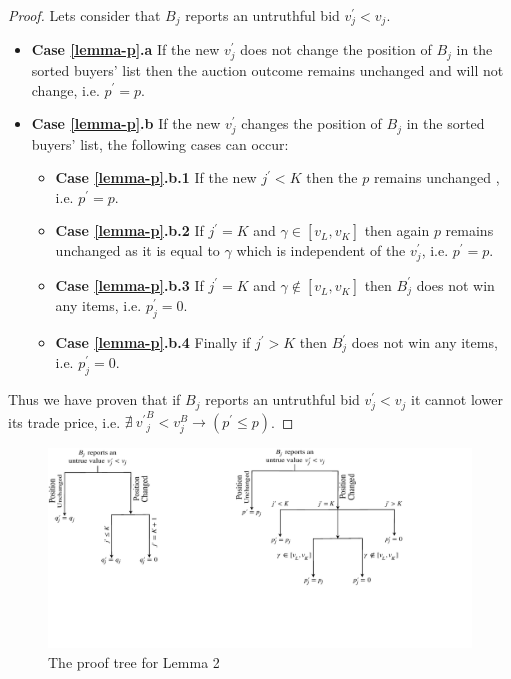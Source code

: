 \begin{proof}
Lets consider that $B_j$ reports an untruthful bid $v^\prime_j < v_j$.
\begin{itemize}
    \item[] \textbf{Case \ref{lemma-p}.a} If the new $v^\prime_j$ does not change the position of $B_j$ in the sorted buyers' list then the auction outcome remains unchanged and will not change, i.e. $p^\prime = p$.
    \item[] \textbf{Case \ref{lemma-p}.b} If the new $v^\prime_j$ changes the position of $B_j$ in the sorted buyers' list, the following cases can occur:
    \begin{itemize}
    \item[] \textbf{Case \ref{lemma-p}.b.1} If the new $j^\prime < K$ then the $p$ remains unchanged , i.e. $p^\prime = p$.
    \item[] \textbf{Case \ref{lemma-p}.b.2} If $j^\prime = K$ and $\gamma \in [{v^{}_L}, {v^{}_K}]$ then again $p$ remains unchanged as it is equal to $\gamma$ which is independent of the $v^\prime_j$, i.e. $p^\prime = p$.
    \item[] \textbf{Case \ref{lemma-p}.b.3} If $j^\prime = K$ and $\gamma \notin [{v^{}_L} , {v^{}_K}]$ then $B^\prime_j$ does not win any items, i.e. $p^\prime_j=0$.
    \item[] \textbf{Case \ref{lemma-p}.b.4} Finally if $j^\prime > K$ then $B^\prime_j$ does not win any items, i.e. $p^\prime_j=0$.
    \end{itemize}
\end{itemize}
Thus we have proven that if $B_j$ reports an untruthful bid $v^\prime_j < v_j$ it cannot lower its trade price, i.e. $\nexists \ {{v^\prime}^B_{j} < v^B_{j}}\rightarrow ({p^\prime} \leq p)$.
\end{proof}
\begin{figure}[htbp]
\vspace{-3mm}
\centering
\includegraphics{Figures/proofp}
\caption{The proof tree for Lemma 2}
\label{fig-proof-p}
\vspace{-4mm}
\end{figure}
